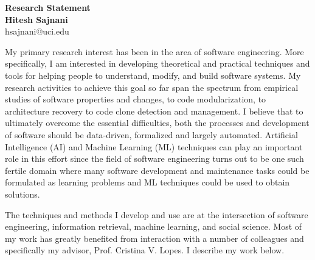 \documentclass[a4paper]{article}
\begin{document}

\begin{center}
{\LARGE \textbf{Research Statement}} \\[.3in]
{\large  \textbf{Hitesh Sajnani}} \\
{\small hsajnani@uci.edu}
\end{center}
\pagestyle{fancy}
\lhead{\textcolor{black}{\it Hitesh Sajnani}}
\rhead{\textcolor{black}{\thepage/\pageref{LastPage}}}

\vspace*{.5in}

My primary research interest has been in the area of software engineering. More specifically, I am interested in developing theoretical and practical techniques and tools for helping people to understand, modify, and build software systems. My research activities to achieve this goal so far span the spectrum from empirical studies of software properties and changes, to code modularization, to architecture recovery to code clone detection and management. 
I believe that to ultimately overcome the essential difficulties, both the processes and development of software should be data-driven, formalized and largely automated. Artificial Intelligence (AI) and Machine Learning (ML) techniques can play an important role in this effort since the field of software engineering turns out to be one such fertile domain where many software development and maintenance tasks could be formulated as learning problems and ML techniques could be used to obtain solutions.

The techniques and methods I develop and use are at the intersection of software engineering, information retrieval, machine learning, and social science.
Most of my work has greatly benefited from interaction with a number of colleagues and specifically my advisor, Prof. Cristina V. Lopes. I describe my work below.


\end{document}
